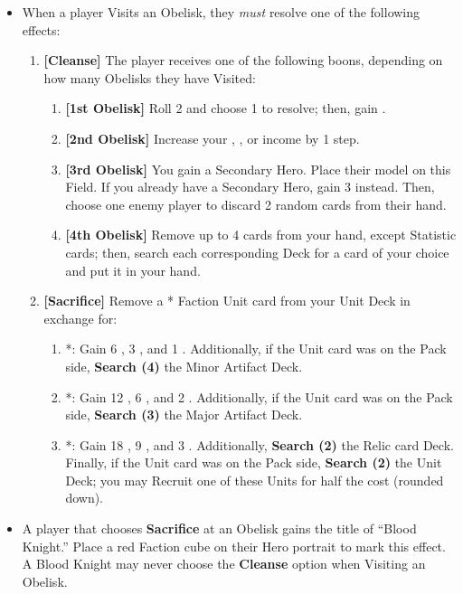 \begin{multicols*}{2}
\begin{itemize}
  \item When a player Visits an Obelisk, they \textit{must} resolve one of the following effects:
  \begin{enumerate}[leftmargin=15pt]
    \item \textbf{[Cleanse]} The player receives one of the following boons, depending on how many Obelisks they have Visited:
    \begin{enumerate}
      \item \textbf{[1st Obelisk]} Roll 2  and choose 1 to resolve; then, gain .
      \item \textbf{[2nd Obelisk]} Increase your , , or  income by 1 step.
      \item \textbf{[3rd Obelisk]} You gain a Secondary Hero. Place their model on this Field. If you already have a Secondary Hero, gain 3  instead. Then, choose one enemy player to discard 2 random cards from their hand.
      \item \textbf{[4th Obelisk]} Remove up to 4 cards from your hand, except Statistic cards; then, search each corresponding Deck for a card of your choice and put it in your hand.
    \end{enumerate}
    \item \textbf{[Sacrifice]} Remove a * Faction Unit card from your Unit Deck in exchange for:
    \begin{enumerate}
      \item *: Gain 6 , 3 , and 1 . Additionally, if the Unit card was on the Pack side, \textbf{Search (4)} the Minor Artifact Deck.
      \item *: Gain 12 , 6 , and 2 . Additionally, if the Unit card was on the Pack side, \textbf{Search (3)} the Major Artifact Deck.
      \item *: Gain 18 , 9 , and 3 . Additionally, \textbf{Search (2)} the Relic card Deck. Finally, if the Unit card was on the Pack side, \textbf{Search (2)} the  Unit Deck; you may Recruit one of these Units for half the cost (rounded down).
    \end{enumerate}
  \end{enumerate}
  \item A player that chooses \textbf{Sacrifice} at an Obelisk gains the title of ``\textcolor{darkcandyapplered}{Blood Knight}.'' Place a red Faction cube on their Hero portrait to mark this effect. A \textcolor{darkcandyapplered}{Blood Knight} may never choose the \textbf{Cleanse} option when Visiting an Obelisk.

\end{itemize}
\end{multicols*}
